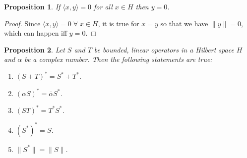 \documentclass{article}
\theoremstyle{plain}
\numberwithin{thm}{section}
\theoremstyle{plain}
\newtheorem{prop}{Proposition}
\numberwithin{prop}{section}
\theoremstyle{definition}
\numberwithin{defn}{section}
\theoremstyle{remark}
\numberwithin{equation}{section}
\begin{document}
\begin{prop}\label{s5p2}
If $\langle x, y\rangle = 0$ for all $x \in H$ then $y = 0$.
\end{prop}
\begin{proof}
Since $\langle x, y\rangle = 0 \;\forall\; x \in H$, it is true for $x = y$ so
that we have $\lVert y \rVert = 0$, which can happen iff $y = 0$.
\end{proof}

\begin{prop}\label{s5p3}
Let $S$ and $T$ be bounded, linear operators in a Hilbert space $H$ and $\alpha$
be a complex number. Then the following statements are true:
\begin{enumerate}
\item $(S + T)^\ast = S^\ast + T^\ast$.
\item $(\alpha S)^\ast = \bar{\alpha}S^\ast$.
\item $(ST)^\ast = T^\ast S^\ast$.
\item $(S^\ast)^\ast = S$.
\item $\lVert S^\ast\rVert = \lVert S \rVert$.
\end{enumerate}
\end{prop}
\end{document}
